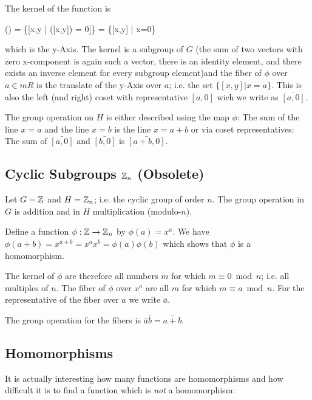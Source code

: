The kernel of the function is

\bee
{}(\phi) = \{[x,y | \phi([x,y]) = 0]\} = \{[x,y] | x=0\}
\eee

which is the y-Axis. The kernel is a subgroup of $G$ (the sum of two vectors with zero x-component is again such a vector, there is an identity element, and there exists an inverse element for every subgroup element)and the fiber of $\phi$ over $a \in mR$ is the translate of the y-Axis over $a$; i.e. the set $\{[x,y] | x=a\}$. This is also the left (and right) coset with representative $[a,0]$ wich we write as $\bar{[a,0]}$.

The group operation on $H$ is either described using the map $\phi$: The sum of the line $x=a$ and the line $x=b$ is the line $x=a+b$ or via coset representatives: The sum of $\bar{[a,0]}$ and $\bar{[b,0]}$ is $\bar{[a+b,0]}$.

\subsection{Cyclic Subgroups $\mathbb{Z}_n$ (Obsolete)}

Let $G = \mathbb{Z}$ and $H = \mathbb{Z}_n$; i.e. the cyclic group of order $n$. The group operation in $G$ is addition and in $H$ multiplication (modulo-$n$).

Define a function $\phi: \mathbb{Z} \rightarrow \mathbb{Z}_n$ by $\phi(a) = x^a$. We have $\phi(a + b) = x^{a+b} = x^a x^b = \phi(a) \phi(b)$ which shows that $\phi$ is a homomorphism.

The kernel of $\phi$ are therefore all numbers $m$ for which $m \equiv 0 \bmod n$; i.e. all multiples of $n$. The fiber of $\phi$ over $x^a$ are all $m$ for which $m \equiv a \bmod n$. For the representative of the fiber over $a$ we write $\bar{a}$.

The group operation for the fibers is $\bar{a} \bar{b} = \bar{a+b}$.

\subsection{Homomorphisms}

It is actually interesting how many functions are homomorphisms and how difficult it is to find a function which is \emph{not} a homomorphism:

